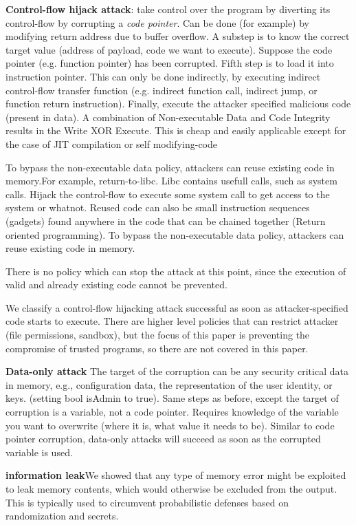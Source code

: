 \documentclass{article}
\begin{document}
\textbf{Control-flow hijack attack}: take control over the program by diverting its control-flow by corrupting a \textit{code pointer}. Can be done (for example) by modifying return address due to buffer overflow. A substep is to know the correct target value (address of payload, code we want to execute). Suppose the code pointer (e.g. function pointer) has been corrupted. Fifth step is to load it into instruction pointer. This can only be done indirectly, 
by executing indirect control-flow transfer function (e.g. indirect function call, indirect jump, or function return instruction). Finally, execute the attacker specified malicious code (present in data). A combination of Non-executable Data and Code Integrity results in the Write XOR Execute. This is cheap and easily applicable except for the case of JIT compilation or self modifying-code 

To bypass the non-executable data policy, attackers can reuse existing code in memory.For example, return-to-libc. Libc contains usefull calls, such as system calls. Hijack the control-flow to execute some system call to get access to the system or whatnot. Reused code can also be small instruction sequences (gadgets) found anywhere in the code that can be chained together (Return oriented programming). To bypass the non-executable data policy, attackers can
reuse existing code in memory.

There is no policy which can stop the attack at this
point, since the execution of valid and already existing code
cannot be prevented.

We classify a control-flow hijacking attack successful as
soon as attacker-specified code starts to execute. There are higher level policies that can restrict attacker (file permissions, sandbox), but the focus of this paper is preventing
 the compromise of trusted programs, so there are not covered in this paper. 

\textbf{Data-only attack} The target of the corruption can be any security critical data in memory, e.g., configuration data, the representation of the user identity, or keys. (setting bool isAdmin to true). Same steps as before, except the target of corruption is a variable, not a code pointer. Requires knowledge of the variable you want to overwrite (where it is, what value it needs to be). Similar to code pointer corruption, data-only attacks will
succeed as soon as the corrupted variable is used.

\textbf{information leak}We showed that any type of memory error might be exploited to leak memory contents, which would otherwise
be excluded from the output. This is typically used to circumvent probabilistic defenses based on randomization and
secrets.
\end{document}
